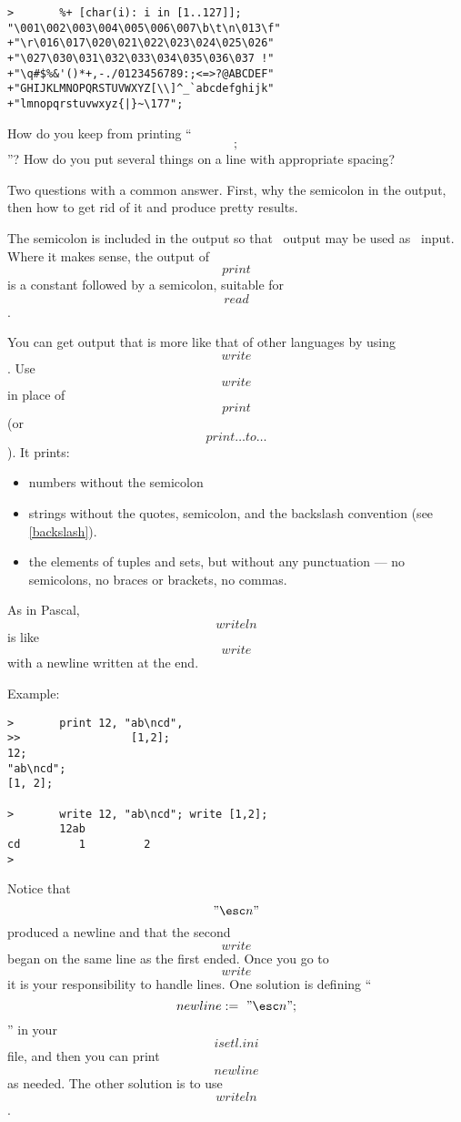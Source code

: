 \begin{description}
\begin{verbatim}
>       %+ [char(i): i in [1..127]];
"\001\002\003\004\005\006\007\b\t\n\013\f"
+"\r\016\017\020\021\022\023\024\025\026"
+"\027\030\031\032\033\034\035\036\037 !"
+"\q#$%&'()*+,-./0123456789:;<=>?@ABCDEF"
+"GHIJKLMNOPQRSTUVWXYZ[\\]^_`abcdefghijk"
+"lmnopqrstuvwxyz{|}~\177";
\end{verbatim}




\Q How do you keep from printing ``\[;\]''?
    How do you put several things on a line with appropriate spacing?
    \label{write}

\A Two questions with a common answer.  First, why the semicolon in the
    output, then how to get rid of it and produce pretty results.

    The semicolon is included in the output so that \ISETL\ output may be
    used as \ISETL\ input.  Where it makes sense, the output of \[print\]
    is a constant followed by a semicolon, suitable for \[read\].

    You can get output that is more like that of other languages by using
    \[write\].  Use \[write\] in place of \[print\] (or \[print\ldots
    to\ldots\]). It prints:
    \begin{itemize}
	\item numbers without the semicolon
	\item strings without the quotes, semicolon, 
		and the backslash convention (see \ref{backslash}).  
	\item the elements of tuples and sets,
		but without any punctuation ---
		no semicolons, no braces or brackets, no commas.
    \end{itemize}
    As in Pascal, \[writeln\] is like \[write\] with a newline written
    at the end.

    Example:\nopagebreak
\begin{verbatim}
>       print 12, "ab\ncd",
>>                 [1,2];
12;
"ab\ncd";
[1, 2];

>       write 12, "ab\ncd"; write [1,2];
        12ab
cd         1         2
>       
\end{verbatim}

    Notice that \["\esc n"\] produced a newline and that the second
    \[write\] began on the same line as the first ended.  Once you go
    to \[write\] it is your responsibility to handle lines.
    One solution is defining ``\[newline:=~"\esc n";\]'' in your \[isetl.ini\]
    file, and then you can print \[newline\] as needed.
    The other solution is to use \[writeln\].


\end{description}
